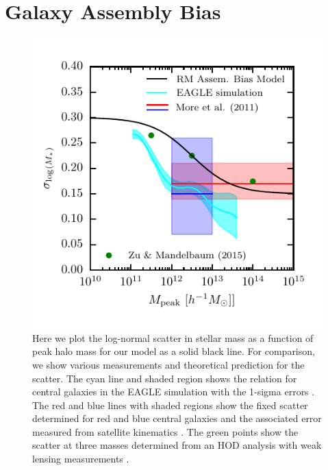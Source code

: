 \documentclass[a4paper,fleqn,usenatbib]{mnras}
\begin{document}
\section{Galaxy Assembly Bias}
\label{sec:assem_bias} 

\begin{figure}
    \includegraphics{figures/scatter_model.pdf}
    \caption{Here we plot the log-normal scatter in stellar mass as a function of peak halo mass for our model as a solid black line.  For comparison, we show various measurements and theoretical prediction for the scatter.  The cyan line and shaded region shows the relation for central galaxies in the EAGLE simulation with the 1-sigma errors \citep{Matthee:2016vm}.  The red and blue lines with shaded regions show the fixed scatter determined for red and blue central galaxies and the associated error measured from satellite kinematics \citep{More:2011il}.  The green points show the scatter at three masses determined from an HOD analysis with weak lensing measurements \citep{Zu:2015vh}.}
    \label{fig:scatter_model}
\end{figure}
\end{document}
